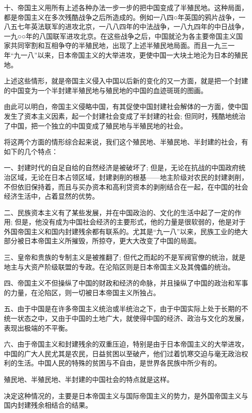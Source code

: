 \documentclass[UTF8, 12pt, a4paper]{ctexrep}
\begin{document}
十、帝国主义用所有上述各种办法一步一步的把中国变成了半殖民地。这种局面，都是帝国主义在多次残酷战争之后所造成的。例如一八四○年英国的鸦片战争，一八五七年英法联军的进攻北京，一八八四年的中法战争，一八九四年的中日战争，一九○○年的八国联军进攻北京。在这些战争之后，中国就沦为各主要帝国主义国家共同宰割和互相争夺的半殖民地，出现了上述半殖民地局面。而且一九三一年“九一八”以来，日本帝国主义的大举进攻，更使中国一大块土地沦为日本的殖民地。

上述这些情形，就是帝国主义侵入中国以后新的变化的又一方面，就是把一个封建的中国变为一个半封建半殖民地与殖民地的中国的血迹斑斑的图画。

由此可以明白，帝国主义侵略中国，有其促使中国封建社会解体的一方面，使中国发生了资本主义因素，起一个封建社会变成了半封建的社会; 但同时，残酷地统治了中国，把一个独立的中国变成了殖民地与半殖民地的社会。

将这两个方面的情形综合起来说，我们这个殖民地、半殖民地、半封建的社会，有如下的几个特点：

一、封建时代的自足自给的自然经济是被破坏了; 但是，无论在抗战的中国政府统治区域，无论在日本占领区域，封建剥削的根基——地主阶级对农民的封建剥削，不但依旧保持着，而且与买办资本和高利贷资本的剥削结合在一起，在中国的社会经济生活中，占着显然的优势。

二、民族资本主义有了某些发展，并在中国政治的、文化的生活中起了一定的作用; 但是，他没有成为中国社会经济的主要形式，他的力量是很软弱的，他是对于外国帝国主义和国内封建残余都有联系的。尤其是“九一八”以来，民族工业的绝大部分被日本帝国主义所摧毁，所掠夺，更大大改变了中国的局面。

三、皇帝和贵族的专制主义是被推翻了; 但代之而起的不是军阀官僚的统治，就是地主与大资产阶级联盟的专政。在沦陷区则是日本帝国主义及其傀儡的统治。

四、帝国主义不但操纵了中国的财政和经济的命脉，并且操纵了中国的政治和军事的力量，在沦陷区，则一切被日本帝国主义所独占。

五、由于中国是在许多帝国主义统治或半统治之下，由于中国实际上处于长期的不统一状态之中，又由于中国的土地广大，就使得中国的经济、政治与文化的发展，表现出极端的不平衡。

六、由于帝国主义和封建残余的双重压迫，特别是由于日本帝国主义的大举进攻，中国的广大人民尤其是农民，日益贫困以至破产，他们过着饥寒交迫与毫无政治权利的生活。中国人民的特殊的贫困与不自由，是世界各民族中所少有的。

殖民地、半殖民地、半封建的中国社会的特点就是这样。

决定这种情况的，主要是日本帝国主义与国际帝国主义的势力，是外国帝国主义与国内封建残余相结合的结果。
\end{document}
